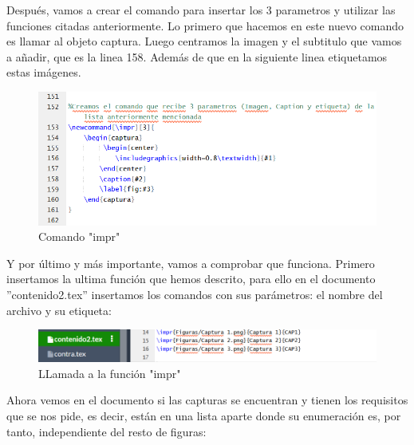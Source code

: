 \documentclass{article}
\begin{document}
Después, vamos a crear el comando para insertar los 3 parametros y utilizar las funciones citadas anteriormente. Lo primero que hacemos en este nuevo comando es llamar al objeto captura. Luego centramos la imagen y el subtitulo que vamos a añadir, que es la linea 158. Además de que en la siguiente linea etiquetamos estas imágenes.\\

\begin{figure}[h!]
\centering
\includegraphics[scale=1]{CAP4}
\caption{Comando "impr"}
\label{fig:cap1}
\end{figure}

Y por último y más importante, vamos a comprobar que funciona. Primero insertamos la ultima función que hemos descrito, para ello en el documento ''contenido2.tex'' insertamos los comandos con sus parámetros: el nombre del archivo y su etiqueta: \\ 

\begin{figure}[h!]
\centering
\includegraphics[scale=1]{PRUEBA1.PNG}
\caption{LLamada a la función "impr"}
\label{fig:cap1}
\end{figure}

Ahora vemos en el documento si las capturas se encuentran y tienen los requisitos que se nos pide, es decir, están en una lista aparte donde su enumeración es, por tanto, independiente del resto de figuras: \\
\end{document}
